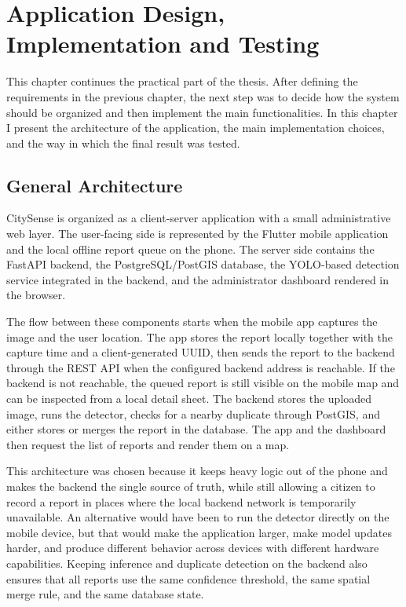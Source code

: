 \chapter{Application Design, Implementation and Testing}

This chapter continues the practical part of the thesis. After defining the requirements in the previous chapter, the next step was to decide how the system should be organized and then implement the main functionalities. In this chapter I present the architecture of the application, the main implementation choices, and the way in which the final result was tested.

\section{General Architecture}

CitySense is organized as a client-server application with a small administrative web layer. The user-facing side is represented by the Flutter mobile application and the local offline report queue on the phone. The server side contains the FastAPI backend, the PostgreSQL/PostGIS database, the YOLO-based detection service integrated in the backend, and the administrator dashboard rendered in the browser.

The flow between these components starts when the mobile app captures the image and the user location. The app stores the report locally together with the capture time and a client-generated UUID, then sends the report to the backend through the REST API when the configured backend address is reachable. If the backend is not reachable, the queued report is still visible on the mobile map and can be inspected from a local detail sheet. The backend stores the uploaded image, runs the detector, checks for a nearby duplicate through PostGIS, and either stores or merges the report in the database. The app and the dashboard then request the list of reports and render them on a map.

This architecture was chosen because it keeps heavy logic out of the phone and makes the backend the single source of truth, while still allowing a citizen to record a report in places where the local backend network is temporarily unavailable. An alternative would have been to run the detector directly on the mobile device, but that would make the application larger, make model updates harder, and produce different behavior across devices with different hardware capabilities. Keeping inference and duplicate detection on the backend also ensures that all reports use the same confidence threshold, the same spatial merge rule, and the same database state.

